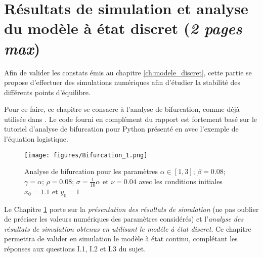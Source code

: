 \chapter{Résultats de simulation et analyse du modèle à état discret (\textit{2 pages max})}
\label{ch:simu}

Afin de valider les constats émis au chapitre \ref{ch:modele_discret}, cette partie se propose d'effectuer des simulations numériques afin d'étudier la stabilité des différents points d'équilibre.

Pour ce faire, ce chapitre se consacre à l'analyse de bifurcation, comme déjà utilisée dans \cite{ChaosControl}. Le code fourni en complément du rapport est fortement basé sur le tutoriel d'analyse de bifurcation pour Python présenté en \cite{bifurc} avec l'exemple de l'équation logistique.

\begin{figure}
    \label{fig:bifurc 1}
    \begin{center}
		\texttt{[image: figures/Bifurcation\_1.png]}
	\end{center}
	\caption{Analyse de bifurcation pour les paramètres $\alpha \in [1, 3]$; $\beta = 0.08$; $\gamma = \alpha$; $\rho = 0.08$; $\sigma = \frac{1}{10}\alpha$ et $\nu = 0.04$ avec les conditions initiales $x_0 = 1.1$ et $y_0 = 1$}
\end{figure}


Le Chapitre \ref{ch:simu} porte sur la \textit{présentation des résultats de simulation} (ne pas oublier de préciser les valeurs numériques des paramètres considérés) et l’\textit{analyse des résultats de simulation obtenus en utilisant le modèle à état discret}.
Ce chapitre permettra de valider en simulation le modèle à état continu, complétant les réponses aux questions I.1, I.2 et I.3 du sujet.
